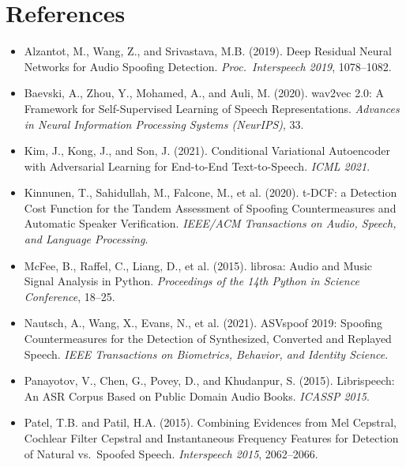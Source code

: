 \documentclass[12pt,a4paper]{article}
\begin{document}
\section*{References}

\begin{itemize}[leftmargin=2em, itemsep=5pt]
  \item Alzantot, M., Wang, Z., and Srivastava, M.B. (2019). Deep Residual Neural
    Networks for Audio Spoofing Detection.
    \textit{Proc.\ Interspeech 2019}, 1078--1082.

  \item Baevski, A., Zhou, Y., Mohamed, A., and Auli, M. (2020). wav2vec 2.0: A
    Framework for Self-Supervised Learning of Speech Representations.
    \textit{Advances in Neural Information Processing Systems (NeurIPS)}, 33.

  \item Kim, J., Kong, J., and Son, J. (2021). Conditional Variational Autoencoder
    with Adversarial Learning for End-to-End Text-to-Speech. \textit{ICML 2021}.

  \item Kinnunen, T., Sahidullah, M., Falcone, M., et al. (2020). t-DCF: a Detection
    Cost Function for the Tandem Assessment of Spoofing Countermeasures and Automatic
    Speaker Verification.
    \textit{IEEE/ACM Transactions on Audio, Speech, and Language Processing}.

  \item McFee, B., Raffel, C., Liang, D., et al. (2015). librosa: Audio and Music
    Signal Analysis in Python.
    \textit{Proceedings of the 14th Python in Science Conference}, 18--25.

  \item Nautsch, A., Wang, X., Evans, N., et al. (2021). ASVspoof 2019: Spoofing
    Countermeasures for the Detection of Synthesized, Converted and Replayed Speech.
    \textit{IEEE Transactions on Biometrics, Behavior, and Identity Science}.

  \item Panayotov, V., Chen, G., Povey, D., and Khudanpur, S. (2015). Librispeech:
    An ASR Corpus Based on Public Domain Audio Books. \textit{ICASSP 2015}.

  \item Patel, T.B. and Patil, H.A. (2015). Combining Evidences from Mel Cepstral,
    Cochlear Filter Cepstral and Instantaneous Frequency Features for Detection of
    Natural vs.\ Spoofed Speech. \textit{Interspeech 2015}, 2062--2066.


\end{itemize}
\end{document}
